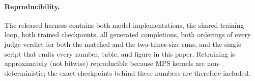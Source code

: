 \documentclass[11pt]{article}
\begin{document}
\paragraph{Reproducibility.} The released harness contains both model
implementations, the shared training loop, both trained checkpoints, all
generated completions, both orderings of every judge verdict for both the
matched and the two-times-size runs, and the single script that emits every
number, table, and figure in this paper. Retraining is approximately (not
bitwise) reproducible because MPS kernels are non-deterministic; the exact
checkpoints behind these numbers are therefore included.



\end{document}
